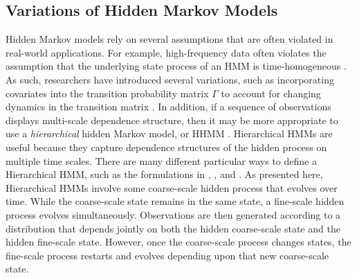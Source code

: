 



\subsection{Variations of Hidden Markov Models}
\label{subsec:HHMM}

Hidden Markov models rely on several assumptions that are often violated in real-world applications. For example, high-frequency data often violates the assumption that the underlying state process of an HMM is time-homogeneous %
\citep{Sidrow:2021}. As such, researchers have introduced several variations, such as incorporating covariates into the transition probability matrix $\Gamma$ to account for changing dynamics in the transition matrix \citep{McClintock:2018}. In addition, if a sequence of observations displays multi-scale dependence structure, then it may be more appropriate to use a \textit{hierarchical} hidden Markov model, or HHMM \citep{Barajas:2017,Adam:2019,Sidrow:2021}. Hierarchical HMMs are useful because they capture dependence structures of the hidden process on multiple time scales. There are many different particular ways to define a Hierarchical HMM, such as the formulations in \citet{Barajas:2017}, \citet{Adam:2019}, and \citet{Sidrow:2021}. As presented here, Hierarchical HMMs involve some coarse-scale hidden process that evolves over time. While the coarse-scale state remains in the same state, a fine-scale hidden process evolves simultaneously. Observations are then generated according to a distribution that depends jointly on both the hidden coarse-scale state and the hidden fine-scale state. However, once the coarse-scale process changes states, the fine-scale process restarts and evolves depending upon that new coarse-scale state.

